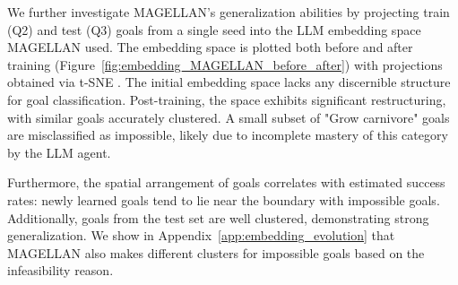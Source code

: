 \documentclass{article}
\begin{document}
We further investigate MAGELLAN's generalization abilities by projecting train (Q2) and test (Q3) goals from a single seed into the LLM embedding space MAGELLAN used. The embedding space is plotted both before and after training (Figure~\ref{fig:embedding_MAGELLAN_before_after}) with projections obtained via t-SNE \cite{JMLR:v9:vandermaaten08a}. The initial embedding space lacks any discernible structure for goal classification. Post-training, the space exhibits significant restructuring, with similar goals accurately clustered. A small subset of "Grow carnivore" goals are misclassified as impossible, likely due to incomplete mastery of this category by the LLM agent.

Furthermore, the spatial arrangement of goals correlates with estimated success rates: newly learned goals tend to lie near the boundary with impossible goals. Additionally, goals from the test set are well clustered, demonstrating strong generalization. We show in Appendix~\ref{app:embedding_evolution} that MAGELLAN also makes different clusters for impossible goals based on the infeasibility reason.
\end{document}
